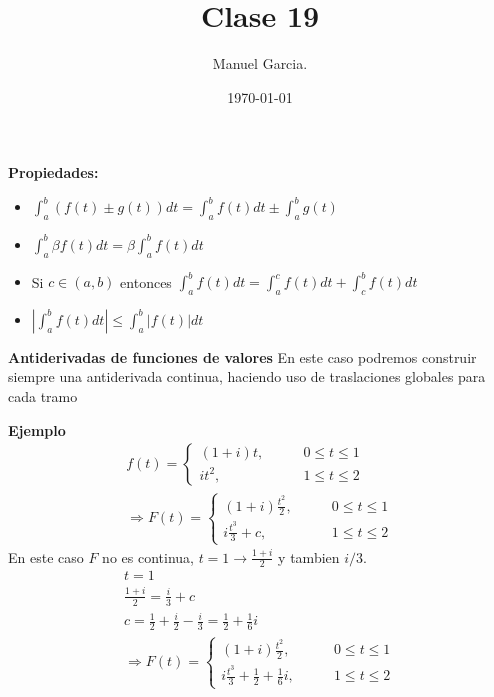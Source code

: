 \documentclass{article}
\title{Clase 19 }
\author{Manuel Garcia.}
\date{\today}
\begin{document}
\maketitle

\section{}
\textbf{Propiedades: }
\begin{itemize}
  \item $ \displaystyle\int_{a }^{b } (f(t) \pm g(t) )dt = \displaystyle\int_{a }^{b }f(t) dt \pm \displaystyle\int_{a }^{b }g(t)  $
  \item $ \displaystyle\int_{a }^{b } \beta f(t) dt = \beta \displaystyle\int_{a }^{b } f(t) dt  $
  \item Si $ c \in (a,b) $ entonces $ \displaystyle\int_{a }^{b }f(t)dt = \displaystyle\int_{a }^{c }f(t) dt + \displaystyle\int_{c }^{b }f(t) dt  $
  \item $\left|\displaystyle\int_{a }^{ b }f(t) dt \right|\leq \displaystyle\int_{a }^{b }\left|f(t) \right|dt $
\end{itemize}

\textbf{Antiderivadas de funciones de valores }
En este caso podremos construir siempre una antiderivada continua, haciendo uso de traslaciones globales para cada tramo

\textbf{Ejemplo }
\begin{gather*}
  f(t) = \begin{cases}
    (1+i)t, \qquad &0 \leq t \leq 1 \\
    it^2, \qquad &1 \leq t \leq 2 
  \end{cases} \\
  \Longrightarrow F(t) = \begin{cases}
    (1+i)\frac{t^2 }{2}, \qquad &0 \leq t \leq 1 \\
    i \frac{t^3 }{3 }+c, \qquad &1 \leq t \leq 2 
  \end{cases}
\end{gather*}
En este caso $ F  $ no es continua, $ t= 1  \rightarrow \frac{1+i }{2}$ y tambien $ i /3  $.
\begin{gather*}
  t = 1 \\
  \frac{1+i }{2 } = \frac{i }{3 } + c \\
  c =  \frac{1}{2} + \frac{i }{2} - \frac{i }{3 } = \frac{1}{2} + \frac{1}{6 }i \\
  \Longrightarrow F(t) = \begin{cases}
    (1+i)\frac{t^2 }{2}, \qquad &0 \leq t \leq 1 \\
    i \frac{t^3 }{3 }+\frac{1}{2} + \frac{1}{6 }i, \qquad &1 \leq t \leq 2 
  \end{cases}
\end{gather*}
\end{document}
